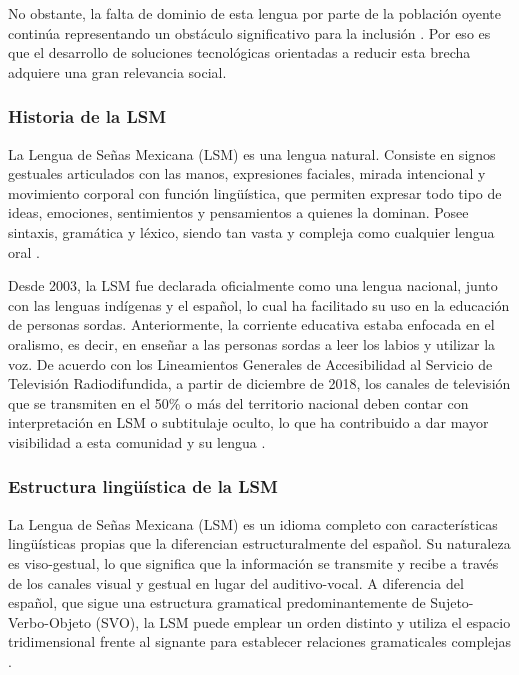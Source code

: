 	No obstante, la falta de dominio de esta lengua por parte de la población oyente continúa representando un obstáculo significativo para la inclusión \cite{sep2023lsm}. Por eso es que el desarrollo de soluciones tecnológicas orientadas a reducir esta brecha adquiere una gran relevancia social.
	
	\subsubsection{Historia de la LSM}
	
	La Lengua de Señas Mexicana (LSM) es una lengua natural. Consiste en signos gestuales articulados con las manos, expresiones faciales, mirada intencional y movimiento corporal con función lingüística, que permiten expresar todo tipo de ideas, emociones, sentimientos y pensamientos a quienes la dominan. Posee sintaxis, gramática y léxico, siendo tan vasta y compleja como cualquier lengua oral \cite{ipn_lsm}.
	
	Desde 2003, la LSM fue declarada oficialmente como una lengua nacional, junto con las lenguas indígenas y el español, lo cual ha facilitado su uso en la educación de personas sordas. Anteriormente, la corriente educativa estaba enfocada en el oralismo, es decir, en enseñar a las personas sordas a leer los labios y utilizar la voz. De acuerdo con los Lineamientos Generales de Accesibilidad al Servicio de Televisión Radiodifundida, a partir de diciembre de 2018, los canales de televisión que se transmiten en el 50\% o más del territorio nacional deben contar con interpretación en LSM o subtitulaje oculto, lo que ha contribuido a dar mayor visibilidad a esta comunidad y su lengua \cite{cultura_lsm}.
	
	\subsubsection{Estructura lingüística de la LSM}
	
	La Lengua de Señas Mexicana (LSM) es un idioma completo con características lingüísticas propias que la diferencian estructuralmente del español. Su naturaleza es viso-gestual, lo que significa que la información se transmite y recibe a través de los canales visual y gestual en lugar del auditivo-vocal. A diferencia del español, que sigue una estructura gramatical predominantemente de Sujeto-Verbo-Objeto (SVO), la LSM puede emplear un orden distinto y utiliza el espacio tridimensional frente al signante para establecer relaciones gramaticales complejas \cite{ipn_lsm}.
	
